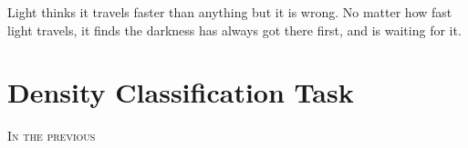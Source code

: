 
\begin{savequote}[99mm]
Light thinks it travels faster than anything but it is wrong. No matter how fast light travels, it finds the darkness has always got there first, and is waiting for it.
\end{savequote}

\chapter{Density Classification Task}
\label{chap:dct}

\lettrine[lines=5, loversize=-0.1, lraise=0.1]{I}{n the previous}
